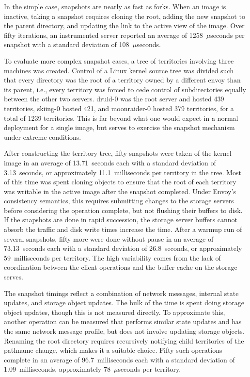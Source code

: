 In the simple case, snapshots are nearly as fast as forks. When an image is inactive, taking a snapshot requires cloning the root, adding the new snapshot to the parent directory, and updating the link to the active view of the image. Over fifty iterations, an instrumented server reported an average of 1258~$\mu$seconds per snapshot with a standard deviation of 108~$\mu$seconds.

To evaluate more complex snapshot cases, a tree of territories involving three machines was created. Control of a Linux kernel source tree was divided such that every directory was the root of a territory owned by a different envoy than its parent, i.e., every territory was forced to cede control of subdirectories equally between the other two servers. druid-0 was the root server and hosted 439 territories, skiing-0 hosted 421, and moonraider-0 hosted 379 territories, for a total of 1239 territories. This is far beyond what one would expect in a normal deployment for a single image, but serves to exercise the snapshot mechanism under extreme conditions.

After constructing the territory tree, fifty snapshots were taken of the kernel image in an average of 13.71~seconds each with a standard deviation of 3.13~seconds, or approximately 11.1~milliseconds per territory in the tree. Most of this time was spent cloning objects to ensure that the root of each territory was writable in the active image after the snapshot completed. Under Envoy's consistency semantics, this requires submitting changes to the storage servers before considering the operation complete, but not flushing their buffers to disk. If the snapshots are done in rapid succession, the storage server buffers cannot absorb the traffic and disk write times increase the time. After a warmup run of several snapshots, fifty more were done without pause in an average of 73.13~seconds each with a standard deviation of 26.8~seconds, or approximately 59~milliseconds per territory. The high variability comes from the lack of coordination between the client operations and the buffer cache on the storage serves.

The snapshot timings reflect a combination of network messages, internal state updates, and storage object updates. The bulk of the time is spent doing storage object updates, though this is not measured directly. To approximate this, another operation can be measured that performs similar state updates and has the same network message profile, but does not involve updating storage objects. Renaming the root directory requires recursively notifying child territories of the pathname change, which makes it a suitable choice. Fifty such operations complete in an average of 96.7~milliseconds each with a standard deviation of 1.09~milliseconds, approximately 78~$\mu$seconds per territory.

